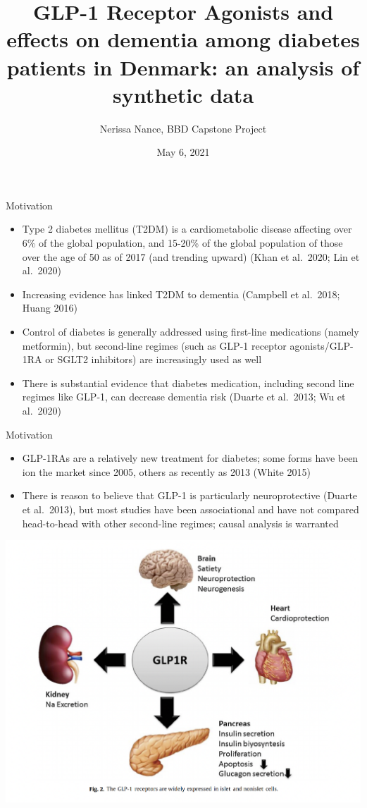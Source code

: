 \documentclass[
  ignorenonframetext,
  twocolumn]{beamer}
\title{GLP-1 Receptor Agonists and effects on dementia among diabetes
patients in Denmark: an analysis of synthetic data}
\author{Nerissa Nance, BBD Capstone Project}
\date{May 6, 2021}
\providecommand{\tightlist}{%
  \setlength{\itemsep}{0pt}\setlength{\parskip}{0pt}}
\renewcommand{\tightlist}{\setlength{\itemsep}{2ex}\setlength{\parskip}{0pt}}
\begin{document}
\frame{\titlepage}

\begin{frame}{Motivation}
\protect\hypertarget{motivation}{}
\begin{itemize}
\tightlist
\item
  Type 2 diabetes mellitus (T2DM) is a cardiometabolic disease affecting
  over 6\% of the global population, and 15-20\% of the global
  population of those over the age of 50 as of 2017 (and trending
  upward) (Khan et al.~2020; Lin et al.~2020)
\item
  Increasing evidence has linked T2DM to dementia (Campbell et al.~2018;
  Huang 2016)
\item
  Control of diabetes is generally addressed using first-line
  medications (namely metformin), but second-line regimes (such as GLP-1
  receptor agonists/GLP-1RA or SGLT2 inhibitors) are increasingly used
  as well
\item
  There is substantial evidence that diabetes medication, including
  second line regimes like GLP-1, can decrease dementia risk (Duarte et
  al.~2013; Wu et al.~2020)
\end{itemize}
\end{frame}

\begin{frame}{Motivation}
\protect\hypertarget{motivation-1}{}
\begin{itemize}
\tightlist
\item
  GLP-1RAs are a relatively new treatment for diabetes; some forms have
  been ion the market since 2005, others as recently as 2013 (White
  2015)
\item
  There is reason to believe that GLP-1 is particularly neuroprotective
  (Duarte et al.~2013), but most studies have been associational and
  have not compared head-to-head with other second-line regimes; causal
  analysis is warranted
\end{itemize}

\begin{center}\includegraphics[width=0.6\linewidth,height=0.5\textheight]{glp1_image} \end{center}
\end{frame}
\end{document}
